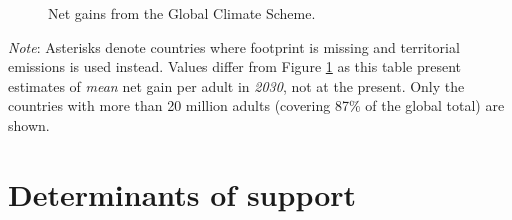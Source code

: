 \begin{figure}[h!]
    \caption{Net gains from the Global Climate Scheme.}\label{fig:median_gain_2015}
\end{figure}

\clearpage
{}
    {\footnotesize \textit{Note}: %
    Asterisks denote countries where footprint is missing and territorial emissions is used instead. %
    Values differ from Figure \ref{fig:median_gain_2015} as this table present estimates of \textit{mean} net gain per adult in \textit{2030}, not at the present. Only the countries with more than 20 million adults (covering 87\% of the global total) are shown. 
    }


\clearpage
\section{Determinants of support}\label{app:determinants}

